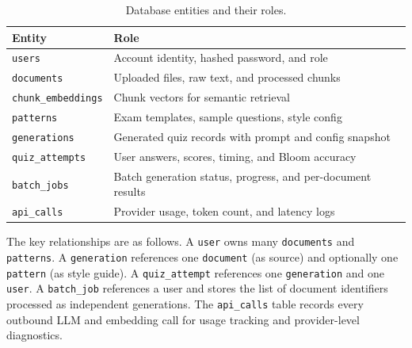 \documentclass[12pt,a4paper]{article}
\begin{document}
\begin{table}[H]
  \centering
  \singlespacing
  \caption{Database entities and their roles.}
  \label{tab:entities}
  \small
  \begin{tabular}{@{}p{3.9cm}p{9.5cm}@{}}
    \toprule
    \textbf{Entity} & \textbf{Role} \\
    \midrule
    \texttt{users}            & Account identity, hashed password, and role \\
    \texttt{documents}        & Uploaded files, raw text, and processed chunks \\
    \texttt{chunk\_embeddings} & Chunk vectors for semantic retrieval \\
    \texttt{patterns}         & Exam templates, sample questions, style config \\
    \texttt{generations}      & Generated quiz records with prompt and config snapshot \\
    \texttt{quiz\_attempts}   & User answers, scores, timing, and Bloom accuracy \\
    \texttt{batch\_jobs}      & Batch generation status, progress, and per-document results \\
    \texttt{api\_calls}       & Provider usage, token count, and latency logs \\
    \bottomrule
  \end{tabular}
\end{table}

The key relationships are as follows. A \texttt{user} owns many
\texttt{documents} and \texttt{patterns}. A \texttt{generation} references
one \texttt{document} (as source) and optionally one \texttt{pattern} (as
style guide). A \texttt{quiz\_attempt} references one \texttt{generation}
and one \texttt{user}. A \texttt{batch\_job} references a user and stores
the list of document identifiers processed as independent generations. The
\texttt{api\_calls} table records every outbound LLM and embedding call for
usage tracking and provider-level diagnostics.
\end{document}
